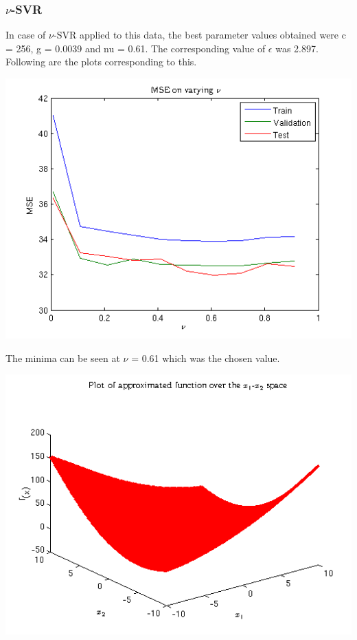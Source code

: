 \documentclass{article}
\begin{document}
\subsubsection{$\nu$-SVR}
In case of $\nu$-SVR applied to this data, the best parameter values obtained were c = 256, g = 0.0039 and nu = 0.61. The corresponding value of $\epsilon$ was 2.897. Following are the plots corresponding to this.
\begin{center}
\includegraphics[scale=0.7]{Regression/bivar/nu/mse}
\end{center}
The minima can be seen at $\nu$ = 0.61 which was the chosen value.
\begin{center}
\includegraphics[scale=0.7]{Regression/bivar/nu/fun}
\end{center}
\end{document}
